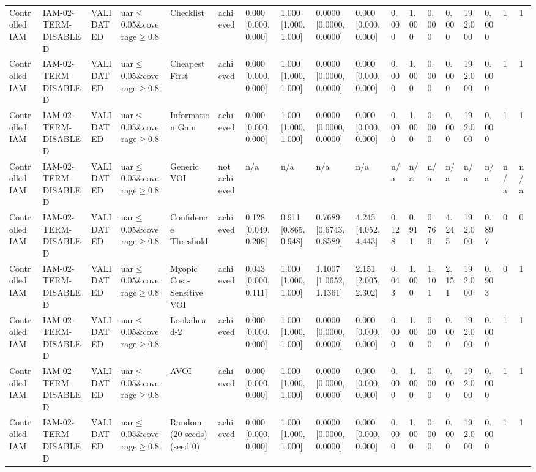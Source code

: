 \begin{table}[!ht]
{\begin{tabular}{llllllllllllllllll}
Controlled IAM & IAM-02-TERM-DISABLED & VALIDATED & uar$\le$0.05\&coverage$\ge$0.8 & Checklist & achieved & 0.000 [0.000, 0.000] & 1.000 [1.000, 1.000] & 0.0000 [0.0000, 0.0000] & 0.000 [0.000, 0.000] & 0.000 & 1.000 & 0.000 & 0.000 & 192.000 & 0.000 & 1 & 1 \\
Controlled IAM & IAM-02-TERM-DISABLED & VALIDATED & uar$\le$0.05\&coverage$\ge$0.8 & Cheapest First & achieved & 0.000 [0.000, 0.000] & 1.000 [1.000, 1.000] & 0.0000 [0.0000, 0.0000] & 0.000 [0.000, 0.000] & 0.000 & 1.000 & 0.000 & 0.000 & 192.000 & 0.000 & 1 & 1 \\
Controlled IAM & IAM-02-TERM-DISABLED & VALIDATED & uar$\le$0.05\&coverage$\ge$0.8 & Information Gain & achieved & 0.000 [0.000, 0.000] & 1.000 [1.000, 1.000] & 0.0000 [0.0000, 0.0000] & 0.000 [0.000, 0.000] & 0.000 & 1.000 & 0.000 & 0.000 & 192.000 & 0.000 & 1 & 1 \\
Controlled IAM & IAM-02-TERM-DISABLED & VALIDATED & uar$\le$0.05\&coverage$\ge$0.8 & Generic VOI & not achieved & n/a & n/a & n/a & n/a & n/a & n/a & n/a & n/a & n/a & n/a & n/a & n/a \\
Controlled IAM & IAM-02-TERM-DISABLED & VALIDATED & uar$\le$0.05\&coverage$\ge$0.8 & Confidence Threshold & achieved & 0.128 [0.049, 0.208] & 0.911 [0.865, 0.948] & 0.7689 [0.6743, 0.8589] & 4.245 [4.052, 4.443] & 0.128 & 0.911 & 0.769 & 4.245 & 192.000 & 0.897 & 0 & 0 \\
Controlled IAM & IAM-02-TERM-DISABLED & VALIDATED & uar$\le$0.05\&coverage$\ge$0.8 & Myopic Cost-Sensitive VOI & achieved & 0.043 [0.000, 0.111] & 1.000 [1.000, 1.000] & 1.1007 [1.0652, 1.1361] & 2.151 [2.005, 2.302] & 0.043 & 1.000 & 1.101 & 2.151 & 192.000 & 0.903 & 0 & 1 \\
Controlled IAM & IAM-02-TERM-DISABLED & VALIDATED & uar$\le$0.05\&coverage$\ge$0.8 & Lookahead-2 & achieved & 0.000 [0.000, 0.000] & 1.000 [1.000, 1.000] & 0.0000 [0.0000, 0.0000] & 0.000 [0.000, 0.000] & 0.000 & 1.000 & 0.000 & 0.000 & 192.000 & 0.000 & 1 & 1 \\
Controlled IAM & IAM-02-TERM-DISABLED & VALIDATED & uar$\le$0.05\&coverage$\ge$0.8 & AVOI & achieved & 0.000 [0.000, 0.000] & 1.000 [1.000, 1.000] & 0.0000 [0.0000, 0.0000] & 0.000 [0.000, 0.000] & 0.000 & 1.000 & 0.000 & 0.000 & 192.000 & 0.000 & 1 & 1 \\
Controlled IAM & IAM-02-TERM-DISABLED & VALIDATED & uar$\le$0.05\&coverage$\ge$0.8 & Random (20 seeds) (seed 0) & achieved & 0.000 [0.000, 0.000] & 1.000 [1.000, 1.000] & 0.0000 [0.0000, 0.0000] & 0.000 [0.000, 0.000] & 0.000 & 1.000 & 0.000 & 0.000 & 192.000 & 0.000 & 1 & 1 \\

\end{tabular}}
\end{table}
